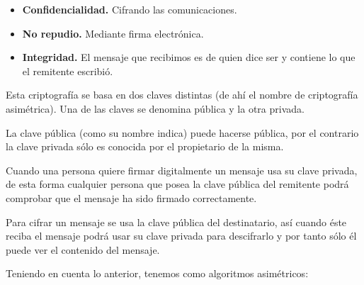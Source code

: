 \documentclass[12pt]{article}
\begin{document}
\begin{itemize}
	\item \textbf{Confidencialidad.} Cifrando las comunicaciones.\par

	\item \textbf{No repudio.} Mediante firma electrónica.\par

	\item \textbf{Integridad.} El mensaje que recibimos es de quien dice ser y contiene lo que el remitente escribió.
\end{itemize}\par


\vspace{\baselineskip}
\begin{justify}
Esta criptografía se basa en dos claves distintas (de ahí el nombre de criptografía asimétrica). Una de las claves se denomina pública y la otra privada.
\end{justify}\par


\vspace{\baselineskip}
\begin{justify}
La clave pública (como su nombre indica) puede hacerse pública, por el contrario la clave privada sólo es conocida por el propietario de la misma.
\end{justify}\par


\vspace{\baselineskip}
\begin{justify}
Cuando una persona quiere firmar digitalmente un mensaje usa su clave privada, de esta forma cualquier persona que posea la clave pública del remitente podrá comprobar que el mensaje ha sido firmado correctamente.
\end{justify}\par


\vspace{\baselineskip}
\begin{justify}
Para cifrar un mensaje se usa la clave pública del destinatario, así cuando éste reciba el mensaje podrá usar su clave privada para descifrarlo y por tanto sólo él puede ver el contenido del mensaje.
\end{justify}\par


\vspace{\baselineskip}
\begin{justify}
Teniendo en cuenta lo anterior, tenemos como algoritmos asimétricos:
\end{justify}\par
\end{document}

